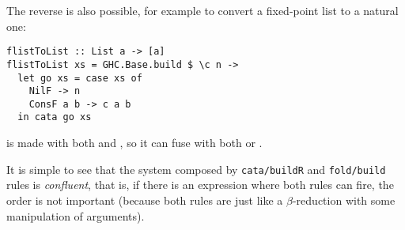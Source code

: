 The reverse is also possible, for example to convert a fixed-point list to a natural one:
\begin{verbatim}
flistToList :: List a -> [a]
flistToList xs = GHC.Base.build $ \c n ->
  let go xs = case xs of
    NilF -> n
    ConsF a b -> c a b
  in cata go xs
\end{verbatim}
\noindent {} is made with both  and , so it can fuse with both  or .

It is simple to see that the system composed by \verb|cata/buildR| and \verb|fold/build| rules is \emph{confluent}, that is, if there is an expression where both rules can fire, the order is not important (because both rules are just like a $\beta$-reduction with some manipulation of arguments).